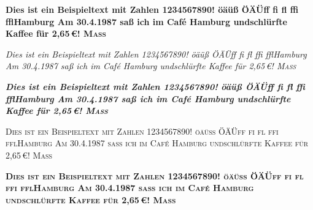 \documentclass[ngerman,a4paper,10pt]{article}
\def\BSP{%
Dies ist ein Beispieltext mit Zahlen 1234567890!\newline%
öäüß ÖÄÜ\quad ff fi fl ffi ffl\quad Hamburg\newline%
Am 30.4.1987 saß ich im \glqq{}Caf\'e Hamburg\grqq{} und\newline schlürfte Kaffee für 2,65\,€!\newline
\textsc{Maß}}
\begin{document}
{\libertine\bfseries\BSP}

{\libertine\itshape\BSP}

{\libertine\bfseries\itshape\BSP}

{\libertine\scshape\BSP}

{\libertine\bfseries\scshape\BSP}
\end{document}
